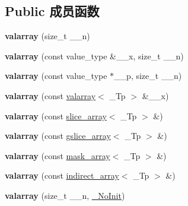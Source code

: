 \subsection*{Public 成员函数}
\begin{DoxyCompactItemize}
\item 
\mbox{\label{classvalarray_a332061bcf9bba0a9c814e657594ca8ba}} 
{\bfseries valarray} (size\+\_\+t \+\_\+\+\_\+n)
\item 
\mbox{\label{classvalarray_af55cc2ecf2eac9782c96af04e63253cb}} 
{\bfseries valarray} (const value\+\_\+type \&\+\_\+\+\_\+x, size\+\_\+t \+\_\+\+\_\+n)
\item 
\mbox{\label{classvalarray_a31f8d5c6398763ec9a0a67057c28f399}} 
{\bfseries valarray} (const value\+\_\+type $\ast$\+\_\+\+\_\+p, size\+\_\+t \+\_\+\+\_\+n)
\item 
\mbox{\label{classvalarray_a67e6607ed65aeaf5020caf7080de93a8}} 
{\bfseries valarray} (const \hyperlink{classvalarray}{valarray}$<$ \+\_\+\+Tp $>$ \&\+\_\+\+\_\+x)
\item 
\mbox{\label{classvalarray_a3a73dc216e4c7e96ec3d2b7e3d50e0a1}} 
{\bfseries valarray} (const \hyperlink{classslice__array}{slice\+\_\+array}$<$ \+\_\+\+Tp $>$ \&)
\item 
\mbox{\label{classvalarray_a6683d3983849a1c6505cb29ddccfbfd0}} 
{\bfseries valarray} (const \hyperlink{classgslice__array}{gslice\+\_\+array}$<$ \+\_\+\+Tp $>$ \&)
\item 
\mbox{\label{classvalarray_a0997e15ec51ae9c8ce2c81c05640b0db}} 
{\bfseries valarray} (const \hyperlink{classmask__array}{mask\+\_\+array}$<$ \+\_\+\+Tp $>$ \&)
\item 
\mbox{\label{classvalarray_a784dfb2082a4d0017e262da015e10e6b}} 
{\bfseries valarray} (const \hyperlink{classindirect__array}{indirect\+\_\+array}$<$ \+\_\+\+Tp $>$ \&)
\item 
\mbox{\label{classvalarray_aa67b3ffd6aaa50af10b13f9563b887ba}} 
{\bfseries valarray} (size\+\_\+t \+\_\+\+\_\+n, \hyperlink{structvalarray_1_1___no_init}{\+\_\+\+No\+Init})

\end{DoxyCompactItemize}
